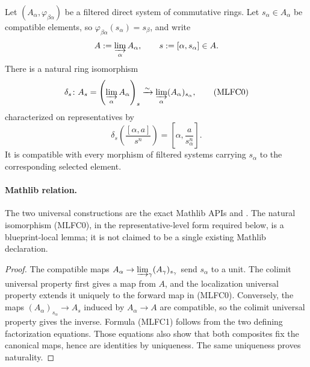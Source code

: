 \begin{lemma}
  \label{lemma:nagata-localization-filtered-colimit}

  Let $(A_\alpha,\varphi_{\beta\alpha})$ be a filtered direct system of
  commutative rings.  Let $s_\alpha\in A_\alpha$ be compatible elements,
  so $\varphi_{\beta\alpha}(s_\alpha)=s_\beta$, and write
  \[
    A:=\varinjlim_\alpha A_\alpha,
    \qquad s:=[\alpha,s_\alpha]\in A.
  \]
  There is a natural ring isomorphism
  \[
    \delta_s\colon
      A_s=\left(\varinjlim_\alpha A_\alpha\right)_s
        \xrightarrow{\sim}
      \varinjlim_\alpha(A_\alpha)_{s_\alpha},                   \tag{MLFC0}
  \]
  characterized on representatives by
  \[
    \delta_s\!\left(\frac{[\alpha,a]}{s^n}\right)
      =\left[\alpha,\frac{a}{s_\alpha^n}\right].                \tag{MLFC1}
  \]
  It is compatible with every morphism of filtered systems carrying
  $s_\alpha$ to the corresponding selected element.

  \paragraph{Mathlib relation.}
  The two universal constructions are the exact Mathlib APIs
  \texttt{} and
  \texttt{}.  The natural isomorphism
  (MLFC0), in the representative-level form required below, is a
  blueprint-local lemma; it is not claimed to be a single existing Mathlib
  declaration.
\end{lemma}

\begin{proof}
  The compatible maps
  $A_\alpha\to\varinjlim_\gamma(A_\gamma)_{s_\gamma}$ send
  $s_\alpha$ to a unit.  The colimit universal property first gives a map
  from $A$, and the localization universal property extends it uniquely to
  the forward map in (MLFC0).  Conversely, the maps
  $(A_\alpha)_{s_\alpha}\to A_s$ induced by $A_\alpha\to A$ are compatible,
  so the colimit universal property gives the inverse.  Formula (MLFC1)
  follows from the two defining factorization equations.  Those equations
  also show that both composites fix the canonical maps, hence are
  identities by uniqueness.  The same uniqueness proves naturality.
\end{proof}

